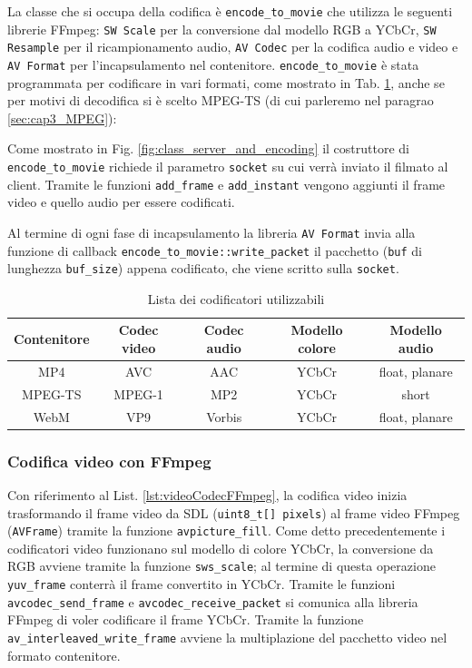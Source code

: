 La classe che si occupa della codifica è \verb|encode_to_movie| che utilizza le seguenti librerie FFmpeg: \verb|SW Scale| per la conversione dal modello RGB a YCbCr, \verb|SW Resample| per il ricampionamento audio, \verb|AV Codec| per la codifica audio e video e \verb|AV Format| per l'incapsulamento nel contenitore. \verb|encode_to_movie| è stata programmata per codificare in vari formati, come mostrato in Tab. \ref{table:PossibiliCodifiche}, anche se per motivi di decodifica si è scelto MPEG-TS (di cui parleremo nel paragrao \ref{sec:cap3_MPEG}):

Come mostrato in Fig. \ref{fig:class_server_and_encoding} il costruttore di \verb|encode_to_movie| richiede il parametro \verb|socket| su cui verrà inviato il filmato al client. Tramite le funzioni \verb|add_frame| e \verb|add_instant| vengono aggiunti il frame video e quello audio per essere codificati.

Al termine di ogni fase di incapsulamento la libreria \verb|AV Format| invia alla funzione di callback \verb|encode_to_movie::write_packet| il pacchetto (\verb|buf| di lunghezza \verb|buf_size|) appena codificato, che viene scritto sulla \verb|socket|. 

\begin{table}[H]
	\centering
	\begin{tabular}{||c c c c c||} 
		\hline
		Contenitore & Codec video & Codec audio & Modello colore & Modello audio \\
		\hline\hline
		MP4 & AVC & AAC & YCbCr & float, planare \\
		\hline
		MPEG-TS & MPEG-1 & MP2 & YCbCr & short \\
		\hline
		WebM & VP9 & Vorbis & YCbCr & float, planare \\
		\hline
	\end{tabular}

	\caption{Lista dei codificatori utilizzabili}
	\label{table:PossibiliCodifiche}
\end{table}



\subsubsection{Codifica video con FFmpeg}
Con riferimento al List. \ref{lst:videoCodecFFmpeg}, la codifica video inizia trasformando il frame video da SDL (\verb|uint8_t[] pixels|) al frame video FFmpeg (\verb|AVFrame|) tramite la funzione \verb|avpicture_fill|. Come detto precedentemente i codificatori video funzionano sul modello di colore YCbCr, la conversione da RGB avviene tramite la funzione \verb|sws_scale|; al termine di questa operazione \verb|yuv_frame| conterrà il frame convertito in YCbCr. Tramite le funzioni \verb|avcodec_send_frame| e \verb|avcodec_receive_packet| si comunica alla libreria FFmpeg di voler codificare il frame YCbCr. Tramite la funzione \verb|av_interleaved_write_frame| avviene la multiplazione del pacchetto video nel formato contenitore.


